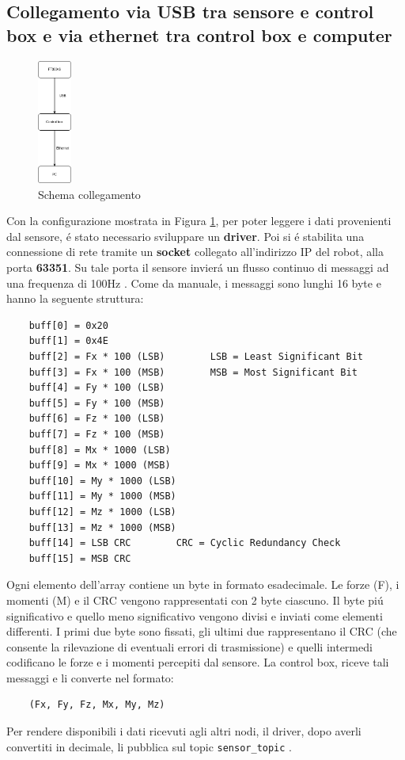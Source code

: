 \subsection{Collegamento via USB tra sensore e control box e via ethernet tra control box e computer}
\begin{figure}[H]
    \centering
    \includegraphics*[width=0.1\textwidth]{images/ft-cbox-pc.png}
    \caption{Schema collegamento}
    \label{fig:ft-cbox-pc}
\end{figure}
Con la configurazione mostrata in Figura \ref{fig:ft-cbox-pc}, per poter leggere i dati provenienti dal sensore, \'{e} stato 
necessario sviluppare un \textbf{driver}. 
Poi si \'{e} stabilita una connessione di rete tramite un \textbf{socket} collegato all'indirizzo IP del robot, 
alla porta \textbf{63351}. 
Su tale porta il sensore invier\'{a} un flusso continuo di messaggi ad una frequenza di 100Hz \cite{ft_sensor}. 
Come da manuale, i messaggi sono lunghi 16 byte e hanno la seguente struttura: 
\begin{verbatim}
    buff[0] = 0x20
    buff[1] = 0x4E
    buff[2] = Fx * 100 (LSB)        LSB = Least Significant Bit
    buff[3] = Fx * 100 (MSB)        MSB = Most Significant Bit
    buff[4] = Fy * 100 (LSB)
    buff[5] = Fy * 100 (MSB)
    buff[6] = Fz * 100 (LSB)
    buff[7] = Fz * 100 (MSB)
    buff[8] = Mx * 1000 (LSB)
    buff[9] = Mx * 1000 (MSB)
    buff[10] = My * 1000 (LSB)
    buff[11] = My * 1000 (MSB)
    buff[12] = Mz * 1000 (LSB)
    buff[13] = Mz * 1000 (MSB)
    buff[14] = LSB CRC        CRC = Cyclic Redundancy Check
    buff[15] = MSB CRC
\end{verbatim} 
Ogni elemento dell'array contiene un byte in formato esadecimale. 
Le forze (F), i momenti (M) e il CRC vengono rappresentati con 2 byte ciascuno. Il byte pi\'{u} significativo e quello meno significativo 
vengono divisi e inviati come elementi differenti.
I primi due byte sono fissati, gli ultimi due rappresentano il CRC (che consente la rilevazione di eventuali errori di 
trasmissione) e quelli intermedi codificano le forze e i momenti percepiti dal sensore. 
La control box, riceve tali messaggi e li converte nel formato:
\begin{verbatim}
    (Fx, Fy, Fz, Mx, My, Mz)
\end{verbatim}
Per rendere disponibili i dati ricevuti agli altri nodi, il driver, dopo averli convertiti in decimale, li pubblica sul 
topic \verb|sensor_topic| \cite{ft_driver}.
